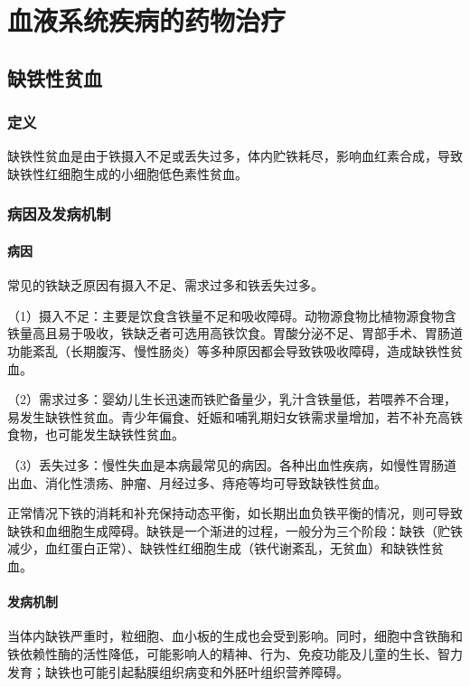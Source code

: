 \chapter{血液系统疾病的药物治疗}

\section{缺铁性贫血}

\subsection{定义}

缺铁性贫血是由于铁摄入不足或丢失过多，体内贮铁耗尽，影响血红素合成，导致缺铁性红细胞生成的小细胞低色素性贫血。

\subsection{病因及发病机制}

\subsubsection{病因}

常见的铁缺乏原因有摄入不足、需求过多和铁丢失过多。

（1）摄入不足：主要是饮食含铁量不足和吸收障碍。动物源食物比植物源食物含铁量高且易于吸收，铁缺乏者可选用高铁饮食。胃酸分泌不足、胃部手术、胃肠道功能紊乱（长期腹泻、慢性肠炎）等多种原因都会导致铁吸收障碍，造成缺铁性贫血。

（2）需求过多：婴幼儿生长迅速而铁贮备量少，乳汁含铁量低，若喂养不合理，易发生缺铁性贫血。青少年偏食、妊娠和哺乳期妇女铁需求量增加，若不补充高铁食物，也可能发生缺铁性贫血。

（3）丢失过多：慢性失血是本病最常见的病因。各种出血性疾病，如慢性胃肠道出血、消化性溃疡、肿瘤、月经过多、痔疮等均可导致缺铁性贫血。

正常情况下铁的消耗和补充保持动态平衡，如长期出血负铁平衡的情况，则可导致缺铁和血细胞生成障碍。缺铁是一个渐进的过程，一般分为三个阶段：缺铁（贮铁减少，血红蛋白正常）、缺铁性红细胞生成（铁代谢紊乱，无贫血）和缺铁性贫血。

\subsubsection{发病机制}

当体内缺铁严重时，粒细胞、血小板的生成也会受到影响。同时，细胞中含铁酶和铁依赖性酶的活性降低，可能影响人的精神、行为、免疫功能及儿童的生长、智力发育；缺铁也可能引起黏膜组织病变和外胚叶组织营养障碍。

